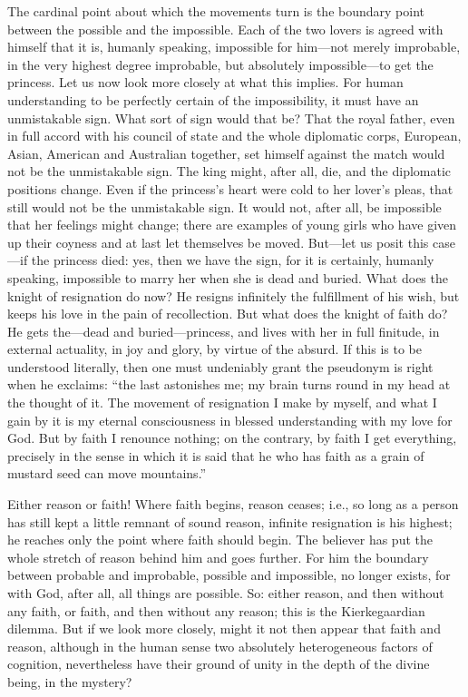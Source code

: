 \documentclass[12pt,a4paper,openany]{book}
\newcommand{\opage}[1]{\marginnote{\footnotesize\textit{[#1]}}}
\begin{document}
The cardinal point about which the movements turn is the boundary point
between the possible and the impossible. \opage{85}Each of the two lovers is agreed
with himself that it is, humanly speaking, impossible for him---not merely
improbable, in the very highest degree improbable, but absolutely
impossible---to get the princess. Let us now look more closely at what
this implies. For human understanding to be perfectly certain of the
impossibility, it must have an unmistakable sign. What sort of sign would
that be? That the royal father, even in full accord with his council of
state and the whole diplomatic corps, European, Asian, American and
Australian together, set himself against the match would not be the
unmistakable sign. The king might, after all, die, and the diplomatic
positions change. Even if the princess's heart were cold to her lover's
pleas, that still would not be the unmistakable sign. It would not, after
all, be impossible that her feelings might change; there are examples of
young girls who have given up their coyness and at last let themselves be
moved. But---let us posit this case---if the princess died: yes, then we
have the sign, for it is certainly, humanly speaking, impossible to marry
her when she is dead and buried. What does the knight of resignation do
now? He resigns infinitely the fulfillment of his wish, but keeps his
love in the pain of recollection. But what does the knight of faith do?
He gets the---dead and buried---princess, and lives with her in full
finitude, in external actuality, in joy and glory, by virtue of the
absurd. If this is to be understood literally, then one must undeniably
grant the pseudonym is right when he exclaims: ``the last astonishes me;
my brain turns round in my head at the thought of it. The movement of
resignation I make by myself, and what I gain by it is my eternal
consciousness \opage{86}in blessed understanding with my love for God. But by
faith I renounce nothing; on the contrary, by faith I get everything,
precisely in the sense in which it is said that he who has faith as a
grain of mustard seed %
can move mountains.''

Either reason or faith! Where faith begins, reason ceases; i.e., so long
as a person has still kept a little remnant of sound reason, infinite
resignation is his highest; he reaches only the point where faith should
begin. The believer has put the whole stretch of reason behind him and
goes further. For him the boundary between probable and improbable,
possible and impossible, no longer exists, for with God, after all, all
things are possible. So: either reason, and then without any faith, or
faith, and then without any reason; this is the Kierkegaardian dilemma.
But if we look more closely, might it not then appear that faith and
reason, although in the human sense two absolutely heterogeneous factors
of cognition, nevertheless have their ground of unity in the depth of the
divine being, in the mystery?
\end{document}
